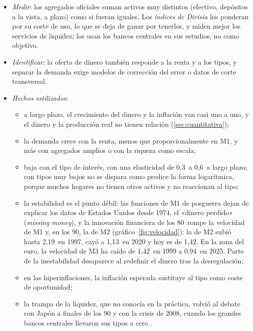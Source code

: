 \documentclass[11pt]{article}
\begin{document}
\begin{itemize}
\item \emph{Medir}: los agregados oficiales suman activos muy distintos (efectivo, depósitos a la vista, a plazo) como si fueran iguales. Los \emph{índices de Divisia} los ponderan por su coste de uso, lo que se deja de ganar por tenerlos, y miden mejor los servicios de liquidez\nocite{Barnett1980Economic}; los usan los bancos centrales en sus estudios, no como objetivo.
\item \emph{Identificar}: la oferta de dinero también responde a la renta y a los tipos, y separar la demanda exige modelos de corrección del error o datos de corte transversal\nocite{MulliganSalaiMartin1992US}.
\item \emph{Hechos estilizados}:
  \begin{itemize}
  \item a largo plazo, el crecimiento del dinero y la inflación van casi uno a uno, y el dinero y la producción real no tienen relación (\ref{sec:cuantitativa});
  \item la demanda crece con la renta, menos que proporcionalmente en M1\nocite{Ball2001Another}, y más con agregados amplios o con la riqueza como escala\nocite{Meltzer1963Demand,KnellStix2005Income};
  \item baja con el tipo de interés, con una elasticidad de 0,3~a 0,6~a largo plazo\nocite{BenatiLucasNicoliniWeber2021}; con tipos muy bajos no se dispara como predice la forma logarítmica, porque muchos hogares no tienen otros activos y no reaccionan al tipo\nocite{MulliganSalaiMartin2000Extensive};
  \item la estabilidad es el punto débil: las funciones de M1 de posguerra dejan de explicar los datos de Estados Unidos desde 1974, el «dinero perdido» (\emph{missing money})\nocite{Goldfeld1976Case}, y la innovación financiera de los 80~rompe la velocidad de M1 y, en los 90, la de M2 (gráfico~\ref{fig:velocidad}): la de M2 subió hasta 2,19~en 1997, cayó a 1,13~en 2020 y hoy es de 1,42\nocite{FRED2026Velocidad}. En la zona del euro, la velocidad de M3 ha caído de 1,42~en 1999 a 0,94~en 2025\nocite{BCE2026BSI,Eurostat2026nama10gdp}. Parte de la inestabilidad desaparece al redefinir el dinero tras la desregulación\nocite{LucasNicolini2015Stability};
  \item en las hiperinflaciones, la inflación esperada sustituye al tipo como coste de oportunidad\nocite{Cagan1956Monetary};
  \item la trampa de la liquidez, que  no conocía en la práctica, volvió al debate con Japón a finales de los 90\nocite{Krugman1998Baaack} y con la crisis de 2008, cuando los grandes bancos centrales llevaron sus tipos a cero .
  \end{itemize}
\end{itemize}
\end{document}
